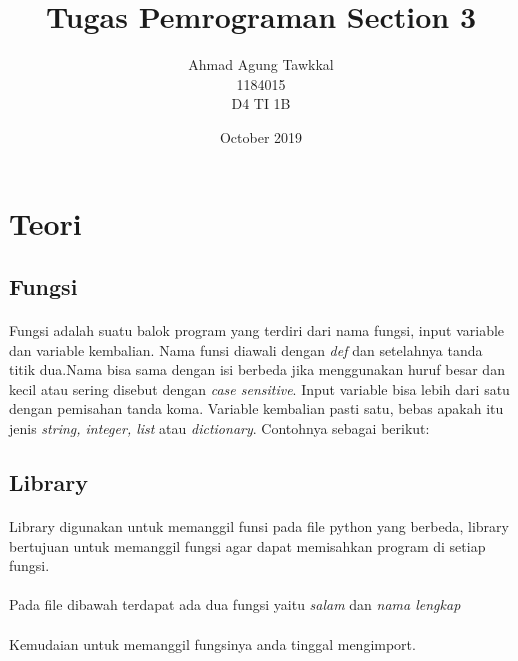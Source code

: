 \documentclass{article}
\title{Tugas Pemrograman Section 3}
\author{Ahmad Agung Tawkkal\\
        1184015\\
        D4 TI 1B}
\date{October 2019}
\begin{document}
\maketitle

\newpage

\section{Teori}
    
    \subsection{Fungsi}
        \paragraph{}Fungsi adalah suatu balok program yang terdiri dari nama fungsi, input variable dan variable kembalian. Nama funsi diawali dengan \textit{def} dan setelahnya tanda titik dua.Nama bisa sama dengan isi berbeda jika menggunakan huruf besar dan kecil atau sering disebut dengan \textit{case sensitive}. Input variable bisa lebih dari satu dengan pemisahan tanda koma. Variable kembalian pasti satu, bebas apakah itu jenis \textit{string, integer, list} atau \textit{dictionary}. Contohnya sebagai berikut:
            
    \subsection{Library}    
        \paragraph{}Library digunakan untuk memanggil funsi pada file python yang berbeda, library bertujuan untuk memanggil fungsi agar dapat memisahkan program di setiap fungsi.
        \paragraph{}Pada file dibawah terdapat ada dua fungsi yaitu \textit{salam} dan \textit{nama lengkap} 
            
        
        \paragraph{}Kemudaian untuk memanggil fungsinya anda tinggal mengimport.
            
    
\end{document}
